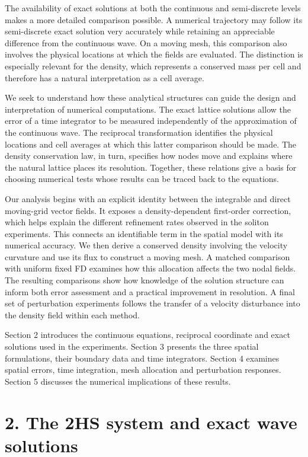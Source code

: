 \documentclass[11pt,a4paper]{article}
\begin{document}
The availability of exact solutions at both the continuous and semi-discrete levels makes a more detailed comparison possible. A numerical trajectory may follow its semi-discrete exact solution very accurately while retaining an appreciable difference from the continuous wave. On a moving mesh, this comparison also involves the physical locations at which the fields are evaluated. The distinction is especially relevant for the density, which represents a conserved mass per cell and therefore has a natural interpretation as a cell average.

We seek to understand how these analytical structures can guide the design and interpretation of numerical computations. The exact lattice solutions allow the error of a time integrator to be measured independently of the approximation of the continuous wave. The reciprocal transformation identifies the physical locations and cell averages at which this latter comparison should be made. The density conservation law, in turn, specifies how nodes move and explains where the natural lattice places its resolution. Together, these relations give a basis for choosing numerical tests whose results can be traced back to the equations.

Our analysis begins with an explicit identity between the integrable and direct moving-grid vector fields. It exposes a density-dependent first-order correction, which helps explain the different refinement rates observed in the soliton experiments. This connects an identifiable term in the spatial model with its numerical accuracy. We then derive a conserved density involving the velocity curvature and use its flux to construct a moving mesh. A matched comparison with uniform fixed FD examines how this allocation affects the two nodal fields. The resulting comparisons show how knowledge of the solution structure can inform both error assessment and a practical improvement in resolution. A final set of perturbation experiments follows the transfer of a velocity disturbance into the density field within each method.

Section 2 introduces the continuous equations, reciprocal coordinate and exact solutions used in the experiments. Section 3 presents the three spatial formulations, their boundary data and time integrators. Section 4 examines spatial errors, time integration, mesh allocation and perturbation responses. Section 5 discusses the numerical implications of these results.

\FloatBarrier
\section*{2. The 2HS system and exact wave solutions}
\end{document}
